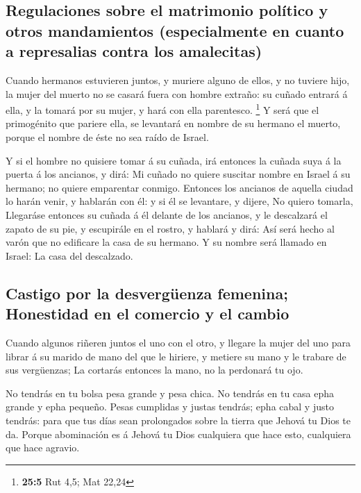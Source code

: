 \hypertarget{regulaciones-sobre-el-matrimonio-poluxedtico-y-otros-mandamientos-especialmente-en-cuanto-a-represalias-contra-los-amalecitas}{%
\subsection{Regulaciones sobre el matrimonio político y otros
mandamientos (especialmente en cuanto a represalias contra los
amalecitas)}\label{regulaciones-sobre-el-matrimonio-poluxedtico-y-otros-mandamientos-especialmente-en-cuanto-a-represalias-contra-los-amalecitas}}

 Cuando hermanos estuvieren juntos, y muriere alguno de
ellos, y no tuviere hijo, la mujer del muerto no se casará fuera con
hombre extraño: su cuñado entrará á ella, y la tomará por su mujer, y
hará con ella parentesco. \footnote{\textbf{25:5} Rut 4,5; Mat 22,24}
 Y será que el primogénito que pariere ella, se levantará
en nombre de su hermano el muerto, porque el nombre de éste no sea raído
de Israel.

 Y si el hombre no quisiere tomar á su cuñada, irá
entonces la cuñada suya á la puerta á los ancianos, y dirá: Mi cuñado no
quiere suscitar nombre en Israel á su hermano; no quiere emparentar
conmigo.  Entonces los ancianos de aquella ciudad lo harán
venir, y hablarán con él: y si él se levantare, y dijere, No quiero
tomarla,  Llegaráse entonces su cuñada á él delante de los
ancianos, y le descalzará el zapato de su pie, y escupirále en el
rostro, y hablará y dirá: Así será hecho al varón que no edificare la
casa de su hermano.  Y su nombre será llamado en Israel:
La casa del descalzado.

\hypertarget{castigo-por-la-desverguxfcenza-femenina-honestidad-en-el-comercio-y-el-cambio}{%
\subsection{Castigo por la desvergüenza femenina; Honestidad en el
comercio y el
cambio}\label{castigo-por-la-desverguxfcenza-femenina-honestidad-en-el-comercio-y-el-cambio}}

 Cuando algunos riñeren juntos el uno con el otro, y
llegare la mujer del uno para librar á su marido de mano del que le
hiriere, y metiere su mano y le trabare de sus vergüenzas;
 La cortarás entonces la mano, no la perdonará tu ojo.

 No tendrás en tu bolsa pesa grande y pesa chica.
 No tendrás en tu casa epha grande y epha pequeño.
 Pesas cumplidas y justas tendrás; epha cabal y justo
tendrás: para que tus días sean prolongados sobre la tierra que Jehová
tu Dios te da.  Porque abominación es á Jehová tu Dios
cualquiera que hace esto, cualquiera que hace agravio.

